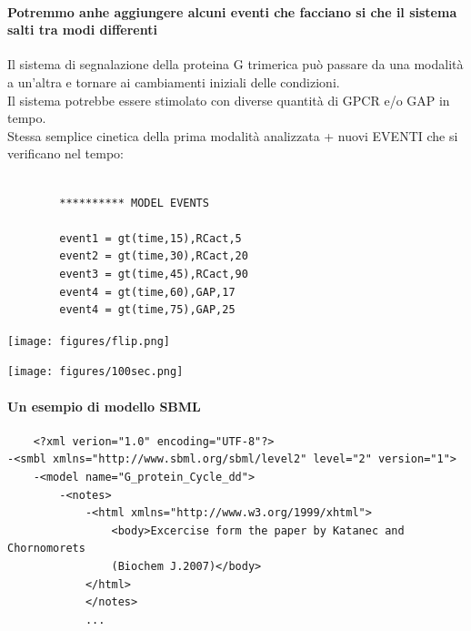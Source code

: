 \documentclass{article}
\begin{document}
\paragraph{Potremmo anhe aggiungere alcuni eventi che facciano si che il sistema salti tra modi differenti}
Il sistema di segnalazione della proteina G trimerica può passare da una modalità a
un'altra e tornare ai cambiamenti iniziali delle condizioni.\\
Il sistema potrebbe essere stimolato con diverse quantità di GPCR e/o GAP in tempo.\\
Stessa semplice cinetica della prima modalità analizzata + nuovi EVENTI che si verificano nel tempo:\\
\begin{minipage}[c]{.5\textwidth}
    \begin{verbatim}

        ********** MODEL EVENTS

        event1 = gt(time,15),RCact,5
        event2 = gt(time,30),RCact,20
        event3 = gt(time,45),RCact,90
        event4 = gt(time,60),GAP,17
        event4 = gt(time,75),GAP,25

    \end{verbatim}
\end{minipage}%
\begin{minipage}[c]{.5\textwidth}
    \centering
    \texttt{[image: figures/flip.png]}
\end{minipage}
\begin{center}
    \texttt{[image: figures/100sec.png]}
\end{center}
\paragraph{Un esempio di modello SBML}
\begin{verbatim}
    <?xml verion="1.0" encoding="UTF-8"?>
-<smbl xmlns="http://www.sbml.org/sbml/level2" level="2" version="1">
    -<model name="G_protein_Cycle_dd">
        -<notes>
            -<html xmlns="http://www.w3.org/1999/xhtml">
                <body>Excercise form the paper by Katanec and Chornomorets
                (Biochem J.2007)</body>
            </html>
            </notes>
            ...
\end{verbatim}
\end{document}
